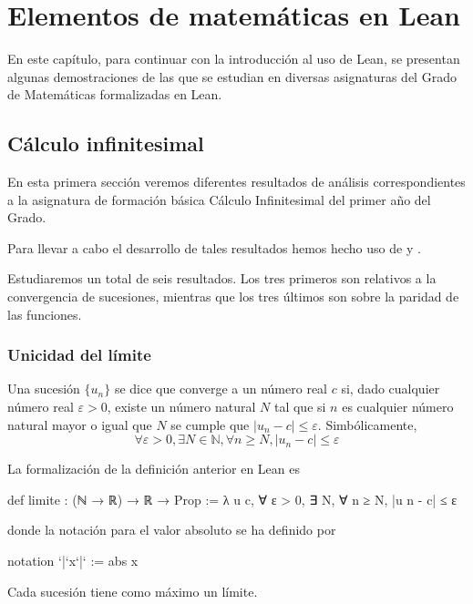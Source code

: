 \chapter{Elementos de matemáticas en Lean}\label{cap2}

En este capítulo, para continuar con la introducción al uso de Lean, se
presentan algunas demostraciones de las que se estudian en diversas
asignaturas del Grado de Matemáticas formalizadas en Lean.

\section{Cálculo infinitesimal}

En esta primera sección veremos diferentes resultados de análisis
correspondientes a la asignatura de formación básica Cálculo
Infinitesimal del primer año del Grado.

Para llevar a cabo el desarrollo de tales resultados hemos hecho uso
de \cite{ML} y \cite{LP}.

Estudiaremos un total de seis resultados. Los tres primeros son relativos
a la convergencia de sucesiones, mientras que los tres últimos son sobre
la paridad de las funciones.

\subsection{Unicidad del límite}

\begin{definicion}\label{limite}
  Una sucesión \(\{u_n\}\) se dice que converge a un número real \(c\) si,
  dado cualquier número real \(ε > 0\), existe un número natural \(N\)
  tal que si \(n\) es cualquier número natural mayor o igual que \(N\) se
  cumple que \(|u_n-c| ≤ ε\). Simbólicamente,
  \[∀ ε > 0, ∃ N ∈ ℕ, ∀ n ≥ N, |u_n-c| ≤ ε \]
\end{definicion}

La formalización de la definición anterior en Lean es
\begin{leancode}
def limite : (ℕ → ℝ) → ℝ → Prop :=
λ u c, ∀ ε > 0, ∃ N, ∀ n ≥ N, |u n - c| ≤ ε
\end{leancode}
donde la notación para el valor absoluto se ha definido por
\begin{leancode}
notation `|`x`|` := abs x
\end{leancode}

\begin{teorema}
Cada sucesión tiene como máximo un límite.
\end{teorema}

